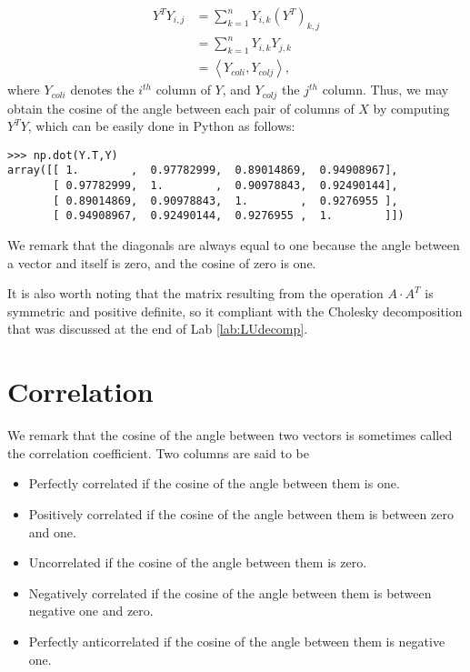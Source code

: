 \begin{align*}
Y^T Y_{i,j} &= \sum_{k=1}^n Y_{i,k}(Y^T)_{k,j} \\
&= \sum_{k=1}^n Y_{i,k}Y_{j,k} \\
&= \left\langle Y_{col i}, Y_{col j} \right\rangle,
\end{align*}
where $Y_{col i}$ denotes the $i^{th}$ column of $Y$, and $Y_{col j}$ the $j^{th}$ column.
Thus, we may obtain the cosine of the angle between each pair of columns of $X$ by computing $Y^T Y$,
which can be easily done in Python as follows:
\begin{lstlisting}
>>> np.dot(Y.T,Y)
array([[ 1.        ,  0.97782999,  0.89014869,  0.94908967],
       [ 0.97782999,  1.        ,  0.90978843,  0.92490144],
       [ 0.89014869,  0.90978843,  1.        ,  0.9276955 ],
       [ 0.94908967,  0.92490144,  0.9276955 ,  1.        ]])
\end{lstlisting}
We remark that the diagonals are always equal to one because the angle between a vector and itself is zero, and the cosine of zero is one.

It is also worth noting that the matrix resulting from the operation $A \cdot A^T$ is symmetric and positive definite, so it compliant 
with the Cholesky decomposition that was discussed at the end of Lab \ref{lab:LUdecomp}.

\section*{Correlation}

We remark that the cosine of the angle between two vectors is sometimes called the correlation coefficient.  Two columns are said to be
\begin{itemize}
\item Perfectly correlated if the cosine of the angle between them is one.
\item Positively correlated if the cosine of the angle between them is between zero and one.
\item Uncorrelated if the cosine of the angle between them is zero.
\item Negatively correlated if the cosine of the angle between them is between negative one and zero.
\item Perfectly anticorrelated if the cosine of the angle between them is negative one.
\end{itemize}

